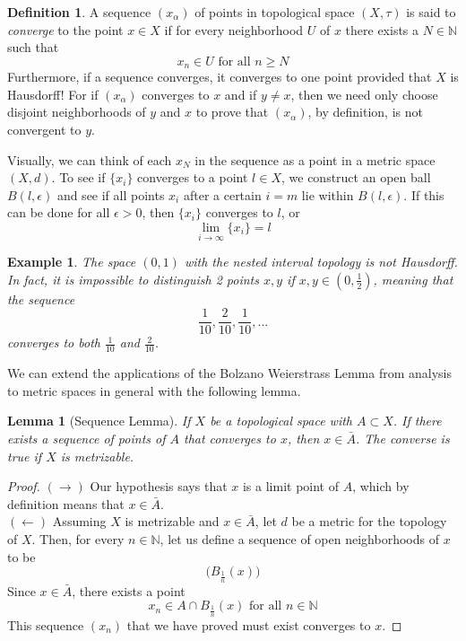 \documentclass{article}
\newtheorem{lemma}[theorem]{Lemma}
\newtheorem{example}{Example}[section]
\theoremstyle{remark}
\theoremstyle{definition}
\newtheorem{definition}{Definition}[section]
\begin{document}
\begin{definition}
A sequence $(x_\alpha)$ of points in topological space $(X, \tau)$ is said to \textit{converge} to the point $x \in X$ if for every neighborhood $U$ of $x$ there exists a $N \in \mathbb{N}$ such that
\[x_n \in U \text{ for all } n \geq N\]
Furthermore, if a sequence converges, it converges to one point provided that $X$ is Hausdorff! For if $(x_\alpha)$ converges to $x$ and if $y \neq x$, then we need only choose disjoint neighborhoods of $y$ and $x$ to prove that $(x_\alpha)$, by definition, is not convergent to $y$.
\end{definition}

Visually, we can think of each $x_N$ in the sequence as a point in a metric space $(X, d)$. To see if $\{ x_i \}$ converges to a point $l \in X$, we construct an open ball $B(l, \epsilon)$ and see if all points $x_i$ after a certain $i = m$ lie within $B (l, \epsilon)$. If this can be done for all $\epsilon > 0$, then $\{ x_i \}$ converges to $l$, or 
\[\lim_{i \to \infty} \{ x_i \} = l \]

\begin{example}
The space $(0,1)$ with the nested interval topology is not Hausdorff. In fact, it is impossible to distinguish 2 points $x, y$ if $x, y \in (0, \frac{1}{2})$, meaning that the sequence
\[\frac{1}{10}, \frac{2}{10}, \frac{1}{10}, ...\]
converges to both $\frac{1}{10}$ and $\frac{2}{10}$.
\end{example} 

We can extend the applications of the Bolzano Weierstrass Lemma from analysis to metric spaces in general with the following lemma. 

\begin{lemma}[Sequence Lemma]
If $X$ be a topological space with $A \subset X$. If there exists a sequence of points of $A$ that converges to $x$, then $x \in \bar{A}$. The converse is true if $X$ is metrizable. 
\end{lemma}
\begin{proof}
$(\rightarrow)$ Our hypothesis says that $x$ is a limit point of $A$, which by definition means that $x \in \bar{A}$. \\
$(\leftarrow)$ Assuming $X$ is metrizable and $x \in \bar{A}$, let $d$ be a metric for the topology of $X$. Then, for every $n \in \mathbb{N}$, let us define a sequence of open neighborhoods of $x$ to be
\[\big(B_{\frac{1}{n}} (x) \big)\]
Since $x \in \bar{A}$, there exists a point 
\[x_n \in A \cap B_{\frac{1}{n}} (x) \text{ for all } n \in \mathbb{N}\]
This sequence $(x_n)$ that we have proved must exist converges to $x$. 
\end{proof}
\end{document}
